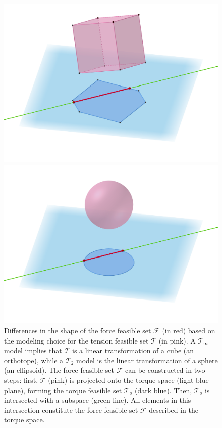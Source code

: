 \begin{figure}[!htb]
  \centering
  \captionsetup{justification=centering}
  \begin{minipage}{0.49\linewidth}
    \centering
    \includegraphics[trim={50 150 50 70}, clip, width=1\linewidth]{img/chapter_3/polytope_better_ggb.png}
  \end{minipage}
  \hfill
  \begin{minipage}{0.49\linewidth}
    \captionsetup{justification=centering}
    \centering
    \includegraphics[trim={50 150 50 70}, clip, width=1\linewidth]{img/chapter_3/polytope_from_sphere_ggb.png}
  \end{minipage}
  \caption{Differences in the shape of the force feasible set $\mathcal{F}$ (in red) based on the modeling choice for the tension feasible set $\mathcal{T}$ (in pink). A $\mathcal{T}_{\infty}$ model implies that $\mathcal{T}$ is a linear transformation of a cube (an orthotope), while a $\mathcal{T}_2$ model is the linear transformation of a sphere (an ellipsoid). The force feasible set $\mathcal{F}$ can be constructed in two steps: first, $\mathcal{T}$ (pink) is projected onto the torque space (light blue plane), forming the torque feasible set $\mathcal{T}_o$ (dark blue). Then, $\mathcal{T}_o$ is intersected with a subspace (green line). All elements in this intersection constitute the force feasible set $\mathcal{F}$ described in the torque space.}
  \label{fig:tension_models}
\end{figure}


